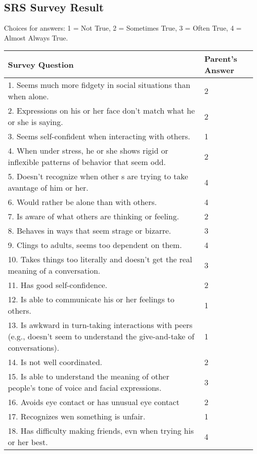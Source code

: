 \begin{appendices}
\chapter{SRS Survey Result}
Choices for answers: 1 = Not True, 2 = Sometimes True, 3 = Often True, 4 = Almost Always True.
\begin{longtable}{ | p{13cm} | l | }
	\hline
	\textbf{Survey Question}	&	\textbf{Parent's Answer}	\\	\hline	\hline		
	1. Seems much more fidgety in social situations than when alone.	&	2	\\	\hline
	2. Expressions on his or her face don't match what he or she is saying.	&	2	\\	\hline
	3. Seems self-confident when interacting with others.	&	1	\\	\hline
	4. When under stress, he or she shows rigid or inflexible patterns of behavior that seem odd.	&	2	\\	\hline
	5. Doesn't recognize when other s are trying to take avantage of him or her.	&	4	\\	\hline
	6. Would rather be alone than with others.	&	4	\\	\hline
	7. Is aware of what others are thinking or feeling.	&	2	\\	\hline
	8. Behaves in ways that seem strage or bizarre.	&	3	\\	\hline
	9. Clings to adults, seems too dependent on them.	&	4	\\	\hline
	10. Takes things too literally and doesn't get the real meaning of a conversation.	&	3	\\	\hline
	11. Has good self-confidence.	&	2	\\	\hline
	12. Is able to communicate his or her feelings to others.	&	1	\\	\hline
	13. Is awkward in turn-taking interactions with peers (e.g., doesn't seem to understand the give-and-take of conversations).	&	1	\\	\hline
	14. Is not well coordinated.	&	2	\\	\hline
	15. Is able to understand the meaning of other people's tone of voice and facial expressions.	&	3	\\	\hline
	16. Avoids eye contact or has unusual eye contact	&	2	\\	\hline
	17. Recognizes wen something is unfair.	&	1	\\	\hline
	18. Has difficulty making friends, evn when trying his or her best.	&	4	\\	\hline

\end{longtable}
\end{appendices}
